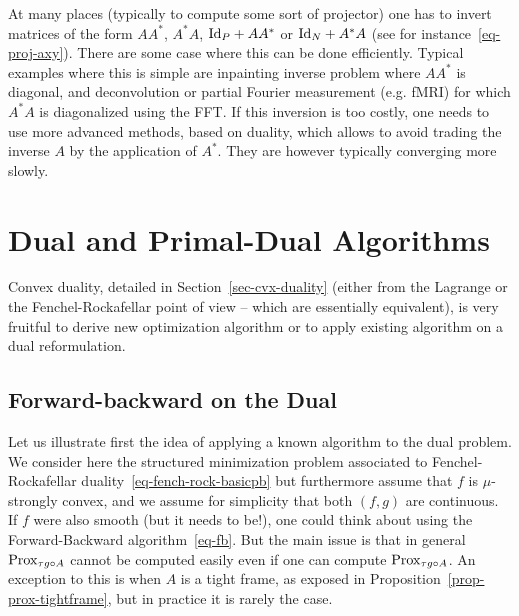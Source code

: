 \begin{rem}\label{rem-inv-lin}
	At many places (typically to compute some sort of projector) one has to invert matrices of the form 
	$AA^*$, $A^*A$, $\mathrm{Id}_P+AA^*$ or $\mathrm{Id}_N+A^*A$ (see for instance~\eqref{eq-proj-axy}).
	There are some case where this can be done efficiently.
	Typical examples where this is simple are inpainting inverse problem where $AA^*$ is diagonal, and deconvolution or partial Fourier measurement (e.g. fMRI) for which $A^*A$ is diagonalized using the FFT.
	If this inversion is too costly, one needs to use more advanced methods, based on duality, which allows to avoid trading the inverse $A$ by the application of $A^*$. They are however typically converging more slowly.
\end{rem}

\section{Dual and Primal-Dual Algorithms}

Convex duality, detailed in Section~\ref{sec-cvx-duality} (either from the Lagrange or the Fenchel-Rockafellar point of view -- which are essentially equivalent), is very fruitful to derive new optimization algorithm or to apply existing algorithm on a dual reformulation.

\subsection{Forward-backward on the Dual}
\label{sec-fb-dual}

Let us illustrate first the idea of applying a known algorithm to the dual problem. We consider here the structured minimization problem associated to Fenchel-Rockafellar duality~\eqref{eq-fench-rock-basicpb}
but furthermore assume that $f$ is $\mu$-strongly convex, and we assume for simplicity that both $(f,g)$ are continuous. If $f$ were also smooth (but it needs to be!), one could think about using the Forward-Backward algorithm~\eqref{eq-fb}. But the main issue is that in general $\operatorname{Prox}_{\tau g \circ A}$ cannot be computed easily even if one can compute $\operatorname{Prox}_{\tau g \circ A}$. An exception to this is when $A$ is a tight frame, as exposed in Proposition~\ref{prop-prox-tightframe}, but in practice it is rarely the case. 

